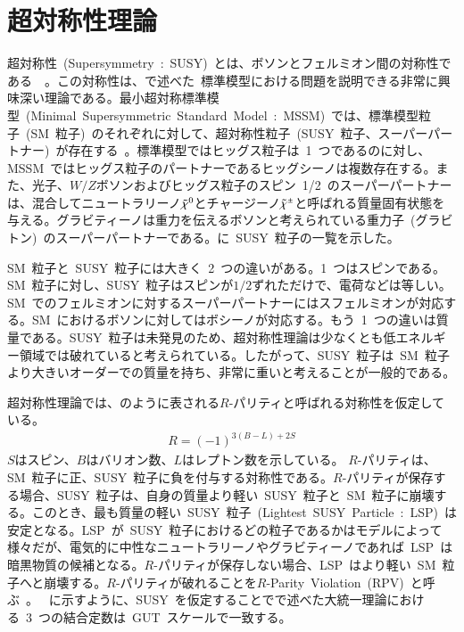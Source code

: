 \section{超対称性理論}
超対称性~(Supersymmetry~:~SUSY)~とは、ボソンとフェルミオン間の対称性である~\cite{AR:12}~\cite{AR:13}。この対称性は、で述べた~標準模型における問題を説明できる非常に興味深い理論である。最小超対称標準模型~(Minimal~Supersymmetric~Standard~Model~:~MSSM)~では、標準模型粒子~(SM~粒子)~のそれぞれに対して、超対称性粒子~(SUSY~粒子、スーパーパートナー)~が存在する~\cite{AR:12}。標準模型ではヒッグス粒子は~1~つであるのに対し、MSSM~ではヒッグス粒子のパートナーであるヒッグシーノは複数存在する。また、光子、$W/Z$ボソンおよびヒッグス粒子のスピン~1/2~のスーパーパートナーは、混合してニュートラリーノ$\Tilde{\chi}^0$とチャージーノ$\Tilde{\chi}^{\pm}$と呼ばれる質量固有状態を与える。グラビティーノは重力を伝えるボソンと考えられている重力子~(グラビトン)~のスーパーパートナーである。に~SUSY~粒子の一覧を示した。

SM~粒子と~SUSY~粒子には大きく~2~つの違いがある。1~つはスピンである。SM~粒子に対し、SUSY~粒子はスピンが$1/2$ずれただけで、電荷などは等しい。SM~でのフェルミオンに対するスーパーパートナーにはスフェルミオンが対応する。SM~におけるボソンに対してはボシーノが対応する。もう~1~つの違いは質量である。SUSY~粒子は未発見のため、超対称性理論は少なくとも低エネルギー領域では破れていると考えられている。したがって、SUSY~粒子は~SM~粒子より大きいオーダーでの質量を持ち、非常に重いと考えることが一般的である。

超対称性理論では、のように表される$R$-パリティと呼ばれる対称性を仮定している。
\begin{align}
    R = (-1)^{3(B-L)+2S} \label{eq:Rparity}
\end{align}
$S$はスピン、$B$はバリオン数、$L$はレプトン数を示している。
$R$-パリティは、SM~粒子に正、SUSY~粒子に負を付与する対称性である。$R$-パリティが保存する場合、SUSY~粒子は、自身の質量より軽い~SUSY~粒子と~SM~粒子に崩壊する。このとき、最も質量の軽い~SUSY~粒子~(Lightest~SUSY~Particle~:~LSP)~は安定となる。LSP~が~SUSY~粒子におけるどの粒子であるかはモデルによって様々だが、電気的に中性なニュートラリーノやグラビティーノであれば~LSP~は暗黒物質の候補となる。$R$-パリティが保存しない場合、LSP~はより軽い~SM~粒子へと崩壊する。$R$-パリティが破れることを$R$-Parity~Violation~(RPV)~と呼ぶ~\cite{AR:12}。
~に示すように、SUSY~を仮定することでで述べた大統一理論における~3~つの結合定数は~GUT~スケールで一致する。

